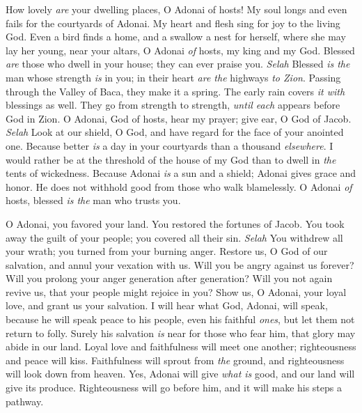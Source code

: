 \begin{biblechapter} %
 How lovely \textit{are} your dwelling places, 
O Adonai of hosts!
\verse My soul longs and even fails 
for the courtyards of Adonai. 
My heart and flesh sing for joy 
to the living God.
\verse Even a bird finds a home, and a swallow a nest for herself, 
where she may lay her young, 
near your altars, O Adonai \textit{of} hosts, 
my king and my God.
\verse Blessed \textit{are} those who dwell in your house; 
they can ever praise you. \textit{Selah}
\verse Blessed \textit{is the} man whose strength \textit{is} in you; 
in their heart \textit{are the} highways \textit{to Zion}.
\verse Passing through the Valley of Baca, 
they make it a spring. 
The early rain covers \textit{it with} blessings as well.
\verse They go from strength to strength, 
\textit{until each} appears before God in Zion.
\verse O Adonai, God of hosts, hear my prayer; 
give ear, O God of Jacob. \textit{Selah}
\verse Look at our shield, O God, 
and have regard for the face of your anointed one.
\verse Because better \textit{is} a day in your courtyards 
than a thousand \textit{elsewhere}. 
I would rather be at the threshold of the house of my God 
than to dwell in \textit{the} tents of wickedness.
\verse Because Adonai \textit{is} a sun and a shield; 
Adonai gives grace and honor. 
He does not withhold good from those who walk blamelessly.
\verse O Adonai \textit{of} hosts, 
blessed \textit{is the} man who trusts you.
\end{biblechapter}

\begin{biblechapter} %
 O Adonai, you favored your land. 
You restored the fortunes of Jacob.
\verse You took away the guilt of your people; 
you covered all their sin. \textit{Selah}
\verse You withdrew all your wrath; 
you turned from your burning anger.
\verse Restore us, O God of our salvation, 
and annul your vexation with us.
\verse Will you be angry against us forever? 
Will you prolong your anger generation after generation?
\verse Will you not again revive us, 
that your people might rejoice in you?
\verse Show us, O Adonai, your loyal love, 
and grant us your salvation.
\verse I will hear what God, Adonai, will speak, 
because he will speak peace 
to his people, even his faithful \textit{ones}, 
but let them not return to folly.
\verse Surely his salvation \textit{is} near for those who fear him, 
that glory may abide in our land.
\verse Loyal love and faithfulness will meet one another; 
righteousness and peace will kiss.
\verse Faithfulness will sprout from \textit{the} ground, 
and righteousness will look down from heaven.
\verse Yes, Adonai will give \textit{what is} good, 
and our land will give its produce.
\verse Righteousness will go before him, 
and it will make his steps a pathway.
\end{biblechapter}

